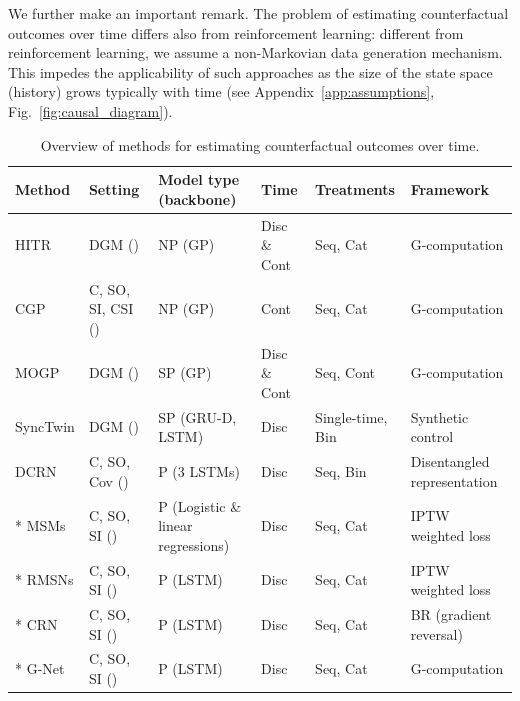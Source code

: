 \documentclass{article}
\theoremstyle{plain}
\theoremstyle{definition}
\theoremstyle{remark}
\newcommand{\cmark}{\textcolor{ForestGreen}{\ding{51}}}%
\newcommand{\xmark}{\textcolor{BrickRed}{\ding{55}}}%
\begin{document}
\noindent
We further make an important remark. The problem of estimating counterfactual outcomes over time differs also from reinforcement learning: different from reinforcement learning, we assume a non-Markovian data generation mechanism. This impedes the applicability of such approaches as the size of the state space (history) grows typically with time (see Appendix~\ref{app:assumptions}, Fig.~\ref{fig:causal_diagram}).

\begin{table}[h!]
    \caption{Overview of methods for estimating counterfactual outcomes over time.}
    \label{tab:methods-comparison}
    \begin{center}
        \scriptsize
                \begin{tabular}{l lllll}
                    \toprule
                    Method & Setting & Model type (backbone) & Time & Treatments & Framework \\
                    \midrule
                    HITR \cite{Xu16} & DGM (\xmark) & NP (GP) & Disc \& Cont & Seq, Cat & G-computation \\
                    CGP \cite{schulam2017reliable} & C, SO, SI, CSI (\xmark) & NP (GP) & Cont & Seq, Cat & G-computation \\
                    MOGP \cite{soleimani2017treatment} & DGM (\xmark) & SP (GP) & Disc \& Cont & Seq, Cont & G-computation \\
                    SyncTwin \cite{qian2021synctwin} & DGM (\xmark) & SP (GRU-D, LSTM) & Disc & Single-time, Bin & Synthetic control \\
                    DCRN \cite{berrevoets2021disentangled} & C, SO, Cov (\xmark) & P (3 LSTMs) & Disc &  Seq, Bin & Disentangled representation \\   
                    \midrule
                    * MSMs \cite{robins2000marginal} & C, SO, SI (\cmark) & P (Logistic \& linear regressions) & Disc & Seq, Cat & IPTW weighted loss \\
                    * RMSNs \cite{lim2018forecasting} & C, SO, SI (\cmark) & P (LSTM) & Disc & Seq, Cat & IPTW weighted loss \\
                    * CRN \cite{bica2020estimating}  & C, SO, SI (\cmark) & P (LSTM) & Disc & Seq, Cat & BR (gradient reversal) \\
                    * G-Net \cite{li2021g} & C, SO, SI (\cmark) & P (LSTM) & Disc & Seq, Cat & G-computation \\

\end{tabular}
\end{center}
\end{table}
\end{document}
